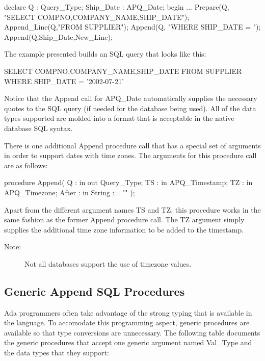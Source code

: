 \documentclass[english,letterpaper]{book}
\begin{document}
\begin{Example}
declare
   Q :         Query_Type;
   Ship_Date : APQ_Date;
begin
   ...
   Prepare(Q,    "SELECT COMPNO,COMPANY_NAME,SHIP_DATE");
   Append_Line(Q,"FROM SUPPLIER");
   Append(Q,     "WHERE SHIP_DATE = ");
   Append(Q,Ship_Date,New_Line);
\end{Example}

The example presented builds an SQL query that looks like this:

\begin{SQL}
SELECT COMPNO,COMPANY_NAME,SHIP_DATE
FROM SUPPLIER
WHERE SHIP_DATE = '2002-07-21'
\end{SQL}

Notice that the Append call for APQ\_Date automatically supplies the
necessary quotes to the SQL query (if needed for the database being
used). All of the data types supported are molded into a format that
is acceptable in the native database SQL syntax. 

There is one additional Append procedure call that has a special set
of arguments in order to support dates with time zones. The arguments
for this procedure call are as follows:

\begin{Code}
procedure Append(
   Q :     in out Query_Type;
   TS :    in     APQ_Timestamp;
   TZ :    in     APQ_Timezone;
   After : in     String := ""
);
\end{Code}

Apart from the different argument names TS and TZ, this
procedure works in the same fashion as the former Append procedure
call. The TZ argument simply supplies the additional time zone
information to be added to the timestamp.

\begin{description}
\item [Note:] Not all databases support the use of timezone values.
\end{description}

\subsection{Generic Append SQL Procedures}

Ada programmers often take advantage of the strong typing that
is available in the language. To accomodate this programming aspect,
generic procedures are available so that type conversions
are unnecessary. The following table documents the generic procedures
that accept one generic argument named Val\_Type and the data
types that they support:
\end{document}
